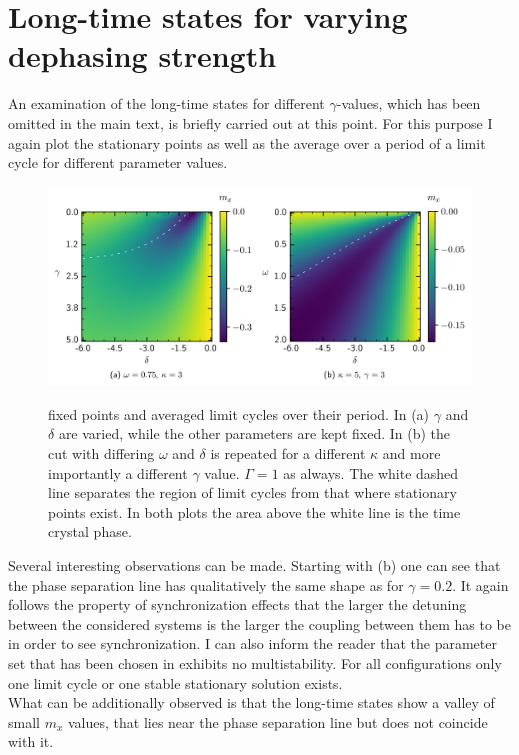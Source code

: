     \section{Long-time states for varying dephasing strength}\label{app:gamma_analysis}
    An examination of the long-time states for different $\gamma$-values, which has been omitted in the main text, is briefly carried out at this point. For this purpose I again plot the stationary points as well as the average over a period of a limit cycle for different parameter values.
    \begin{figure}[H]
        \centering
        \caption{fixed points and averaged limit cycles over their period. In (a) $\gamma$ and $\delta$ are varied, while the other parameters are kept fixed. In (b) the cut with differing $\omega$ and $\delta$ is repeated for a different $\kappa$ and more importantly a different $\gamma$ value. $\Gamma=1$ as always. The white dashed line separates the region of limit cycles from that where stationary points exist. In both plots the area above the white line is the time crystal phase.}
        \includegraphics{pictures/limit_cycle_mean_gw.png}
        \label{fig:gamma_longtime}
    \end{figure}
    Several interesting observations can be made. Starting with (b) one can see that the phase separation line has qualitatively the same shape as for $\gamma=0.2$. It again follows the property of synchronization effects that the larger the detuning between the considered systems is the larger the coupling between them has to be in order to see synchronization. I can also inform the reader that the parameter set that has been chosen in   exhibits no multistability. For all configurations only one limit cycle or one stable stationary solution exists. \\
    What can be additionally observed is that the long-time states show a valley of small $m_x$ values, that lies near the phase separation line but does not coincide with it. \\\\
